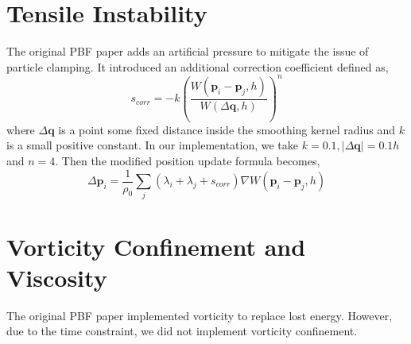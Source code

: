 \documentclass[sigconf]{acmart}
\newcommand{\vect}[1]{\boldsymbol{#1}}
\begin{document}
\section{Tensile Instability}
The original PBF paper adds an artificial pressure to mitigate the issue of particle clamping. It introduced an additional correction coefficient defined as,
\begin{equation}
  s_{corr} = - k \left(\frac{W(\vect{p}_i-\vect{p}_j, h)}{W(\Delta \vect{q}, h)} \right)^n \tag*{(14)}
\end{equation}
where $\Delta \vect{q}$ is a point some fixed distance inside the smoothing kernel radius and $k$ is a small positive constant. In our implementation, we take $k=0.1, |\Delta \vect{q}| = 0.1h$ and $n=4$. Then the modified position update formula becomes,
\begin{equation}
  \Delta \vect{p}_i = \frac{1}{\rho_0} \sum_j (\lambda_i + \lambda_j + s_{corr}) \nabla W(\vect{p}_i - \vect{p}_j , h) \tag*{(15)}
\end{equation}

\section{Vorticity Confinement and Viscosity}
The original PBF paper implemented vorticity to replace lost energy. However, due to the time constraint, we did not implement vorticity confinement.
\end{document}

